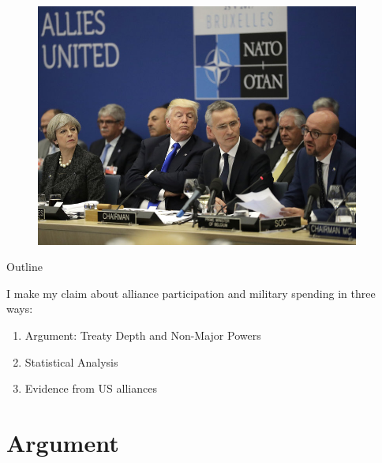 \documentclass[12pt]{beamer}
\begin{document}
\begin{frame}[standout] 

\begin{figure}[htbp]
	\centering
		\includegraphics[width=0.95\textwidth]{trump-nato.jpg}
	\label{fig:trump-nato}
\end{figure}


\end{frame}
 



\begin{frame}{Outline}

I make my claim about alliance participation and military spending in three ways: 

\pause
\begin{enumerate}
\item Argument: Treaty Depth and Non-Major Powers
\pause
\item Statistical Analysis
\pause
\item Evidence from US alliances
\end{enumerate}


\end{frame}


\section{Argument}


\end{document}
